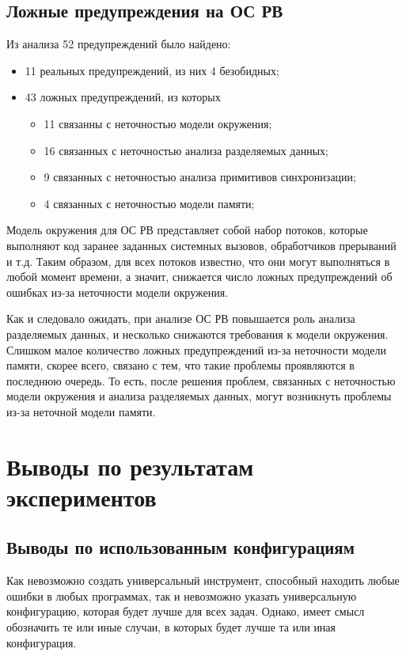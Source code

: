 \subsection{Ложные предупреждения на ОС РВ}

Из анализа 52 предупреждений было найдено:
\begin{itemize}
\item 11 реальных предупреждений, из них 4 безобидных;
\item 43 ложных предупреждений, из которых
\begin{itemize}
\item 11 связанны с неточностью модели окружения;
\item 16 связанных с неточностью анализа разделяемых данных;
\item 9 связанных с неточностью анализа примитивов синхронизации;
\item 4 связанных с неточностью модели памяти;
\end{itemize}
\end{itemize}

Модель окружения для ОС РВ представляет собой набор потоков, которые выполняют код заранее заданных системных вызовов, обработчиков прерываний и т.д.
Таким образом, для всех потоков известно, что они могут выполняться в любой момент времени, а значит, снижается число ложных предупреждений об ошибках из-за неточности модели окружения.

Как и следовало ожидать, при анализе ОС РВ повышается роль анализа разделяемых данных, и несколько снижаются требования к модели окружения.
Слишком малое количество ложных предупреждений из-за неточности модели памяти, скорее всего, связано с тем, что такие проблемы проявляются в последнюю очередь.
То есть, после решения проблем, связанных с неточностью модели окружения и анализа разделяемых данных, могут возникнуть проблемы из-за неточной модели памяти.


\section{Выводы по результатам экспериментов}

\subsection{Выводы по использованным конфигурациям}

Как невозможно создать универсальный инструмент, способный находить любые ошибки в любых программах, так и невозможно указать универсальную конфигурацию, которая будет лучше для всех задач. 
Однако, имеет смысл обозначить те или иные случаи, в которых будет лучше та или иная конфигурация.

